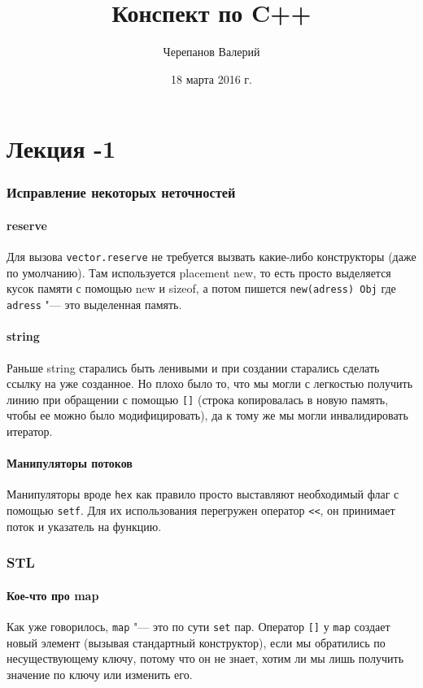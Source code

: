 \documentclass[a4paper,12pt]{article}
\title{Конспект по C++}
\author{Черепанов Валерий}
\date{18 марта 2016 г.}
\newcommand{\cc}{\texttt}
\begin{document}
\maketitle
\part{Лекция -1}

\section{Исправление некоторых неточностей}

\subsection{reserve}
Для вызова \cc{vector.reserve} не требуется вызвать какие-либо конструкторы (даже по умолчанию). Там используется placement new, то есть просто выделяется кусок памяти с помощью new и sizeof, а потом пишется \cc{new(adress) Obj} где \cc{adress} "--- это выделенная память.

\subsection{string}
Раньше string старались быть ленивыми и при создании старались сделать ссылку на уже созданное. Но плохо было то, что мы могли с легкостью получить линию при обращении с помощью \cc{[]} (строка копировалась в новую память, чтобы ее можно было модифицировать), да к тому же мы могли инвалидировать итератор.

\subsection{Манипуляторы потоков}
Манипуляторы вроде \cc{hex} как правило просто выставляют необходимый флаг с помощью \cc{setf}. Для их использования перегружен оператор \cc{<<}, он принимает поток и указатель на функцию.

\section{STL}

\subsection{Кое-что про map}
Как уже говорилось, \cc{map} "--- это по сути \cc{set} пар. Оператор \cc{[]} у \cc{map} создает новый элемент (вызывая стандартный конструктор), если мы обратились по несуществующему ключу, потому что он не знает, хотим ли мы лишь получить значение по ключу или изменить его.
\end{document}
